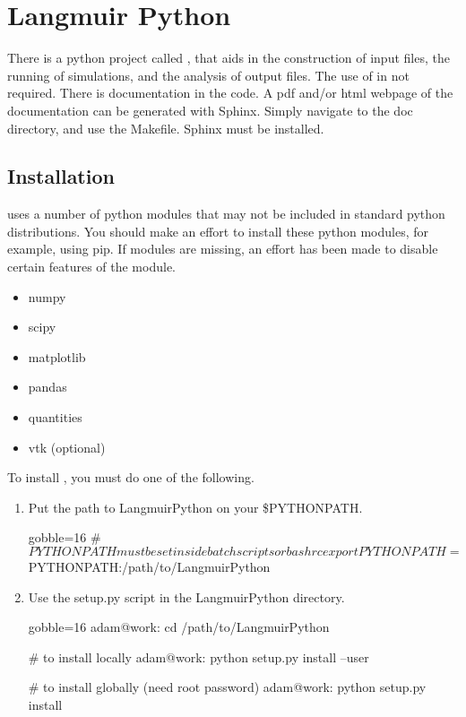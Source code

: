 \newpage
\section{Langmuir Python}
\label{sec:python}
There is a python project called \LangmuirPython, that aids in the
    construction of input files, the running
    of simulations, and the analysis of output files.
The use of \LangmuirPython in not required.
There is documentation in the code.
A pdf and/or html webpage of the documentation can be generated with Sphinx.
Simply navigate to the \LangmuirPython doc directory, and use the Makefile.
Sphinx must be installed.

\subsection{Installation}
    \LangmuirPython uses a number of python modules that may not be
        included in standard python distributions.
    You should make an effort to install these python modules, for
        example, using pip.
    If modules are missing, an effort has been made to disable certain
        features of the \langmuir module.
    \begin{itemize}
        \item numpy
        \item scipy
        \item matplotlib
        \item pandas
        \item quantities
        \item vtk (optional)
    \end{itemize}

    To install \LangmuirPython, you must do one of the following.
    \begin{enumerate}
        \item Put the path to LangmuirPython on your \$PYTHONPATH.
            \begin{bashcode*}{gobble=16}
                # $PYTHONPATH must be set inside batch scripts or bashrc
                export PYTHONPATH=$PYTHONPATH:/path/to/LangmuirPython
            \end{bashcode*}
        \item Use the setup.py script in the LangmuirPython directory.
            \begin{bashcode*}{gobble=16}
                adam@work: cd /path/to/LangmuirPython

                # to install locally
                adam@work: python setup.py install --user

                # to install globally (need root password)
                adam@work: python setup.py install
            \end{bashcode*}
    \end{enumerate}

